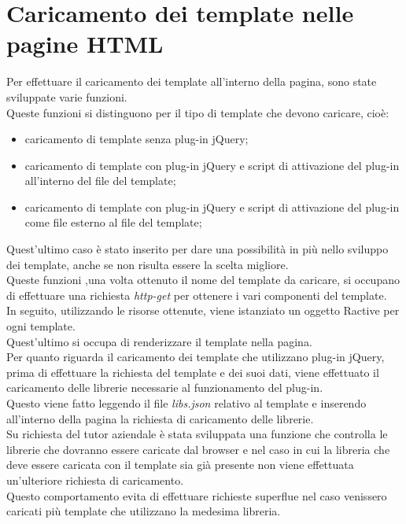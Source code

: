 \section{Caricamento dei template nelle pagine HTML}
Per effettuare il caricamento dei template all'interno della pagina, sono state sviluppate varie funzioni.\\
Queste funzioni si distinguono per il tipo di template che devono caricare, cioè:
\begin{itemize}
	\item caricamento di template senza plug-in jQuery;
	\item caricamento di template con plug-in jQuery e script di attivazione del plug-in all'interno del file del template;
	\item caricamento di template con plug-in jQuery e script di attivazione del plug-in come file esterno al file del template;
\end{itemize} 
Quest'ultimo caso è stato inserito per dare una possibilità in più nello sviluppo dei template, anche se non risulta essere la scelta migliore.\\
Queste funzioni ,una volta ottenuto il nome del template da caricare, si occupano di effettuare una richiesta \textit{http-get} per ottenere i vari componenti del template.\\
In seguito, utilizzando le risorse ottenute, viene istanziato un oggetto Ractive per ogni template.\\
Quest'ultimo si occupa di renderizzare il template nella pagina.\\
Per quanto riguarda il caricamento dei template che utilizzano plug-in jQuery, prima di effettuare la richiesta del template e dei suoi dati, viene effettuato il caricamento delle librerie necessarie al funzionamento del plug-in.\\
Questo viene fatto leggendo il file \textit{libs.json} relativo al template e inserendo all'interno della pagina la richiesta di caricamento delle librerie.\\
Su richiesta del tutor aziendale è stata sviluppata una funzione che controlla le librerie che dovranno essere caricate dal browser e nel caso in cui la libreria che deve essere caricata con il template sia già presente non viene effettuata un'ulteriore richiesta di caricamento.\\
Questo comportamento evita di effettuare richieste superflue nel caso venissero caricati più template che utilizzano la medesima libreria.\\
\newpage
